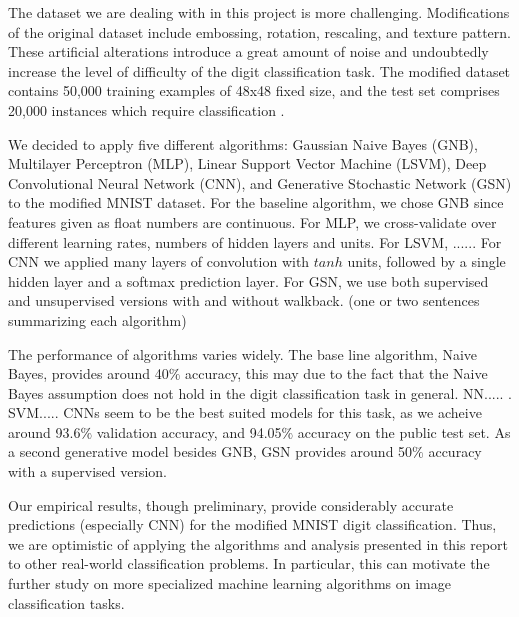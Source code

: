 \documentclass{acm_proc_article-sp}
\begin{document}
The dataset we are dealing with in this project is more challenging. Modifications of the original dataset include embossing, rotation, rescaling, and texture pattern. These artificial alterations introduce a great amount of noise and undoubtedly increase the  level of difficulty of the digit classification task. The modified dataset contains 50,000 training examples of 48x48 fixed size, and the test set comprises 20,000 instances which require classification \cite{comp598p3}.

We decided to apply five different algorithms: Gaussian Naive Bayes (GNB), Multilayer Perceptron (MLP), Linear Support Vector Machine (LSVM), Deep Convolutional Neural Network (CNN), and Generative Stochastic Network (GSN) to the modified MNIST dataset. For the baseline algorithm, we chose GNB since features given as float numbers are continuous. For MLP, we cross-validate over different learning rates, numbers of hidden layers and units. For LSVM, ...... For CNN we applied many layers of convolution with $tanh$ units, followed by a single hidden layer and a softmax prediction layer. For GSN, we use both supervised and unsupervised versions with and without walkback. (one or two sentences summarizing each algorithm)

The performance of algorithms varies widely. The base line algorithm, Naive Bayes, provides around 40$\%$ accuracy, this may due to the fact that the Naive Bayes assumption does not hold in the digit classification task in general. NN..... . SVM..... CNNs seem to be the best suited models for this task, as we acheive around 93.6$\%$ validation accuracy, and 94.05$\%$ accuracy on the public test set. As a second generative model besides GNB, GSN provides around 50$\%$ accuracy with a supervised version.

Our empirical results, though preliminary, provide considerably accurate predictions (especially CNN) for the modified MNIST digit classification. Thus, we are optimistic of applying the algorithms and analysis presented in this report to other real-world  classification problems. In particular, this can motivate the further study on more specialized machine learning algorithms on image classification tasks.




\end{document}
